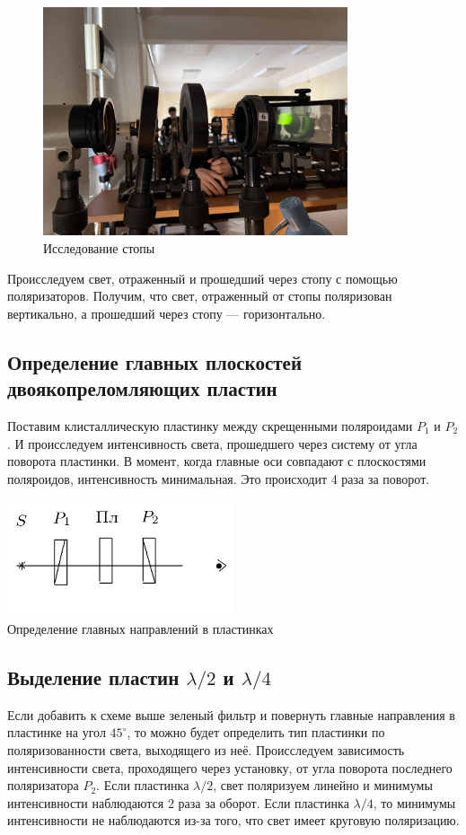 \begin{figure}[H]
\centering
\includegraphics[width=0.80\textwidth]{IMG_3192.JPG}
\caption{Исследование стопы}
\end{figure}

Происследуем свет, отраженный и прошедший через стопу с помощью поляризаторов. Получим, что свет, отраженный от стопы поляризован вертикально, а прошедший через стопу --- горизонтально.

\subsection*{Определение главных плоскостей двоякопреломляющих пластин}

Поставим клисталлическую пластинку между скрещенными поляроидами $P_1$ и $P_2$. И происследуем интенсивность света, прошедшего через систему от угла поворота пластинки. В момент, когда главные оси совпадают с плоскостями поляроидов, интенсивность минимальная. Это происходит 4 раза за поворот.



\begin{center}
\includegraphics[width=0.50\textwidth]{5.png}\\
Определение главных направлений в пластинках
\end{center}

\subsection*{Выделение пластин $\lambda/2$ и $\lambda/4$}
Если добавить к схеме выше зеленый фильтр и повернуть главные направления в пластинке на угол $45^\circ$, то можно будет определить тип пластинки по поляризованности света, выходящего из неё. Происследуем зависимость интенсивности света, проходящего через установку, от угла поворота последнего поляризатора $P_2$. Если пластинка $\lambda/2$, свет поляризуем линейно и минимумы интенсивности наблюдаются 2 раза за оборот. Если пластинка $\lambda/4$, то минимумы интенсивности не наблюдаются из-за того, что свет имеет круговую поляризацию.

